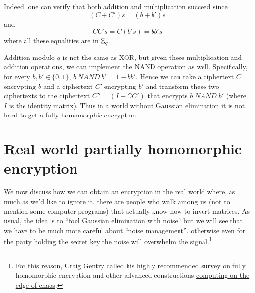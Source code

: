 Indeed, one can verify that both addition and multiplication succeed
since
\begin{equation*}
(C+C')s = (b+b')s
\end{equation*}
and
\begin{equation*}
\ensuremath{\mathit{CC}}'s = C(b's) = bb's
\end{equation*}
where all these equalities are in \({\mathbb{Z}}_q\).

Addition modulo \(q\) is not the same as XOR, but given these
multiplication and addition operations, we can implement the NAND
operation as well. Specifically, for every \(b,b' \in \{0,1\}\),
\(b \; \ensuremath{\mathit{NAND}} \; b' = 1-bb'\). Hence we can take a
ciphertext \(C\) encrypting \(b\) and a ciphertext \(C'\) encrypting
\(b'\) and transform these two ciphertexts to the ciphertext
\(C''=(I-CC')\) that encrypts \(b\; \ensuremath{\mathit{NAND}} \; b'\)
(where \(I\) is the identity matrix). Thus in a world without Gaussian
elimination it is not hard to get a fully homomorphic encryption.

\hypertarget{privkeyfhe}{}

\section{Real world partially homomorphic
encryption}\label{15-Real-world-partially-h}

We now discuss how we can obtain an encryption in the real world where,
as much as we'd like to ignore it, there are people who walk among us
(not to mention some computer programs) that actually know how to invert
matrices. As usual, the idea is to ``fool Gaussian elimination with
noise'' but we will see that we have to be much more careful about
``noise management'', otherwise even for the party holding the secret
key the noise will overwhelm the signal.\footnote{For this reason, Craig
  Gentry called his highly recommended survey on fully homomorphic
  encryption and other advanced constructions
  \href{https://eprint.iacr.org/2014/610}{computing on the edge of
  chaos}.}

